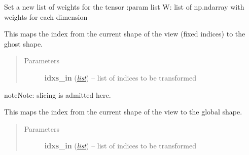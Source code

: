 \documentclass[a4paper,10pt,english]{sphinxmanual}
\begin{document}
\begin{fulllineitems}
\begin{fulllineitems}
\end{fulllineitems}


\begin{fulllineitems}
\label{api-tw:TensorToolbox.core.TensorWrapper.set_weights}
Set a new list of weights for the tensor
:param list W: list of np.ndarray with weights for each dimension

\end{fulllineitems}


\begin{fulllineitems}
\label{api-tw:TensorToolbox.core.TensorWrapper.shape_to_ghost}
This maps the index from the current shape of the view (fixed indices) to the ghost shape.
\begin{quote}\begin{description}
\item[{Parameters}] \leavevmode
\textbf{idxs\_in} (\href{http://docs.python.org/library/functions.html\#list}{\emph{list}}) -- list of indices to be transformed

\end{description}\end{quote}

\begin{notice}{note}{Note:}
slicing is admitted here.
\end{notice}

\end{fulllineitems}


\begin{fulllineitems}
\label{api-tw:TensorToolbox.core.TensorWrapper.shape_to_global}
This maps the index from the current shape of the view to the global shape.
\begin{quote}\begin{description}
\item[{Parameters}] \leavevmode
\textbf{idxs\_in} (\href{http://docs.python.org/library/functions.html\#list}{\emph{list}}) -- list of indices to be transformed

\end{description}\end{quote}


\end{fulllineitems}
\end{fulllineitems}
\end{document}
